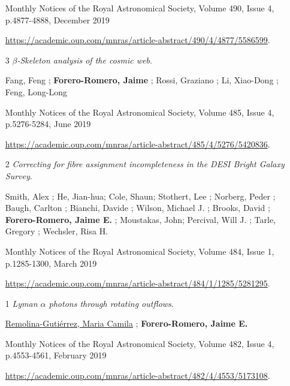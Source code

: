 \documentclass{article}
\begin{document}
\begin{itemize}
Monthly Notices of the Royal Astronomical Society, Volume 490, Issue 4, p.4877-4888, December 2019

\url{https://academic.oup.com/mnras/article-abstract/490/4/4877/5586599}.

\item[3]{\it $\beta$-Skeleton analysis of the cosmic web}.

Fang, Feng ; \textbf{Forero-Romero, Jaime} ; Rossi, Graziano ; Li, Xiao-Dong ; Feng, Long-Long

Monthly Notices of the Royal Astronomical Society, Volume 485, Issue 4, p.5276-5284, June 2019

\url{https://academic.oup.com/mnras/article-abstract/485/4/5276/5420836}.

\item[2] {\it Correcting for fibre assignment incompleteness in the DESI Bright Galaxy Survey}. 

Smith, Alex ; He, Jian-hua; Cole, Shaun; Stothert, Lee ; Norberg, Peder ; Baugh, Carlton ; Bianchi, Davide ; Wilson, Michael J. ; Brooks, David ; \textbf{Forero-Romero, Jaime E.} ; Moustakas, John; Percival, Will J. ; Tarle, Gregory ; Wechsler, Risa H.

Monthly Notices of the Royal Astronomical Society, Volume 484, Issue 1, p.1285-1300, March 2019

\url{https://academic.oup.com/mnras/article-abstract/484/1/1285/5281295}.


\item[1] {\it Lyman $\alpha$ photons through rotating outflows}. 

\underline{Remolina-Gutiérrez, Maria Camila} ; \textbf{Forero-Romero, Jaime E.}

Monthly Notices of the Royal Astronomical Society, Volume 482, Issue 4, p.4553-4561, February 2019

\url{https://academic.oup.com/mnras/article-abstract/482/4/4553/5173108}.

\end{itemize}


\newpage
\end{document}
